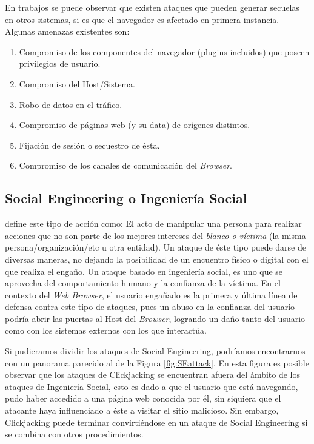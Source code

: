 En trabajos \cite{barth2008security,FirefoxThreatModel} se puede observar que existen ataques que pueden generar secuelas en otros sistemas, si es que el navegador es afectado en primera instancia. Algunas amenazas existentes son:

\begin{enumerate}
	\item Compromiso de los componentes del navegador (plugins incluidos) que poseen privilegios de usuario.
	\item Compromiso del Host/Sistema.
	\item Robo de datos en el tráfico.
	\item Compromiso de páginas web (y su data) de orígenes distintos.
	\item Fijación de sesión o secuestro de ésta.
	\item Compromiso de los canales de comunicación del \textit{Browser}.
\end{enumerate}

\subsection{Social Engineering o Ingeniería Social}
\cite{socEngineeering} define este tipo de acción como: El acto de manipular una persona para realizar acciones que no son parte de los mejores intereses del \textit{blanco o víctima} (la misma persona/organización/etc u otra entidad). Un ataque de éste tipo puede darse de diversas maneras, no dejando la posibilidad de un encuentro físico o digital con el que realiza el engaño. Un ataque basado en ingeniería social, es uno que se aprovecha del comportamiento humano y la confianza de la víctima. En el contexto del \textit{Web Browser}, el usuario engañado es la primera y última línea de defensa contra este tipo de ataques, pues un abuso en la confianza del usuario podría abrir las puertas al Host del \textit{Browser}, logrando un daño tanto del usuario como con los sistemas externos con los que interactúa.

Si pudieramos dividir los ataques de Social Engineering, podríamos encontrarnos con un panorama parecido al de la Figura \ref{fig:SEattack}. En esta figura es posible observar que los ataques de Clickjacking se encuentran afuera del ámbito de los ataques de  Ingeniería Social, esto es dado a que el usuario que está navegando, pudo haber accedido a una página web conocida por él, sin siquiera que el atacante haya influenciado a éste a visitar el sitio malicioso. Sin embargo, Clickjacking puede terminar convirtiéndose en un ataque de Social Engineering si se combina con otros procedimientos.

